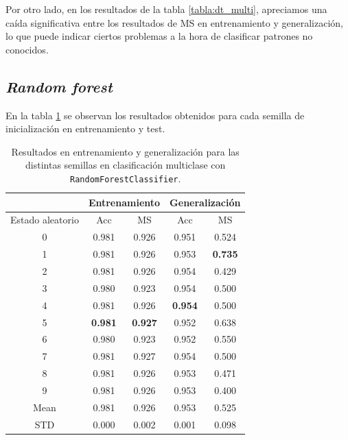 \vspace{1em}

Por otro lado, en los resultados de la tabla \ref{tabla:dt_multi}, apreciamos una caída significativa entre los resultados de MS en entrenamiento y generalización, lo que puede indicar ciertos problemas a la hora de clasificar patrones no conocidos.

\subsection{\textit{Random forest}}
\label{subsec:rf_multi}

En la tabla \ref{tabla:rf_multi} se observan los resultados obtenidos para cada semilla de inicialización en entrenamiento y test.

\begin{table}[H]
	\centering
	\begin{tabular}{ |c|c|c|c|c| }
		\hline
		\rowcolor{LightCyan}
		 & \multicolumn{2}{c|}{Entrenamiento} & \multicolumn{2}{c|}{Generalización} \\
		\hline
		\rowcolor{LightCyan}
		 Estado aleatorio & Acc & MS & Acc & MS \\
		\hline
		0    & 0.981          & 0.926          & 0.951          & 0.524          \\
		1    & 0.981          & 0.926          & 0.953          & \textbf{0.735} \\
		2    & 0.981          & 0.926          & 0.954          & 0.429          \\
		3    & 0.980          & 0.923          & 0.954          & 0.500          \\
		4    & 0.981          & 0.926          & \textbf{0.954} & 0.500          \\
		5    & \textbf{0.981} & \textbf{0.927} & 0.952          & 0.638          \\
		6    & 0.980          & 0.923          & 0.952          & 0.550          \\
		7    & 0.981          & 0.927          & 0.954          & 0.500          \\
		8    & 0.981          & 0.926          & 0.953          & 0.471          \\
		9    & 0.981          & 0.926          & 0.953          & 0.400          \\
		Mean & 0.981          & 0.926          & 0.953          & 0.525          \\
		STD  & 0.000          & 0.002          & 0.001          & 0.098          \\
		\hline
	\end{tabular}
	\caption{Resultados en entrenamiento y generalización para las distintas semillas en clasificación multiclase con  \texttt{RandomForestClassifier}.}
	\label{tabla:rf_multi}
\end{table}

